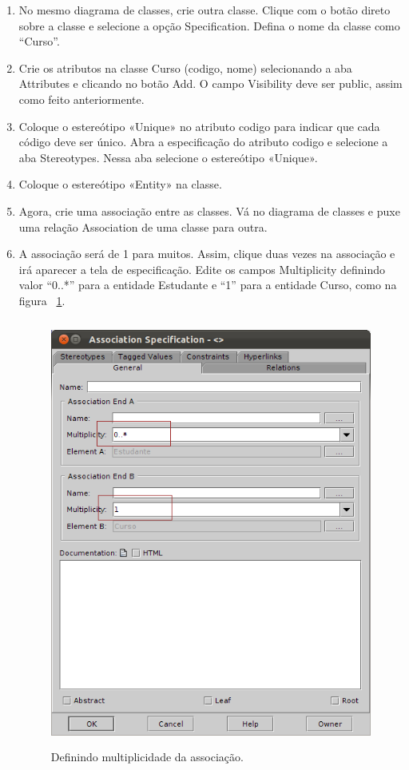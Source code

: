 \begin{enumerate}
\item No mesmo diagrama de classes, crie outra classe. Clique com o botão direto
sobre a classe e selecione a opção Specification. Defina o nome da classe como
“Curso”.
	
\item Crie os atributos na classe Curso (codigo, nome) selecionando a aba
Attributes e clicando no botão Add. O campo Visibility deve ser public, assim
como feito anteriormente.

\item Coloque o estereótipo «Unique» no atributo codigo para indicar que cada
código deve ser único. Abra a especificação do atributo codigo e selecione a aba
Stereotypes. Nessa aba selecione o estereótipo «Unique».
	
\item Coloque o estereótipo «Entity» na classe.
	
\item Agora, crie uma associação entre as classes. Vá no diagrama de classes e
puxe uma relação Association de uma classe para outra.
	
\item A associação será de 1 para muitos. Assim, clique duas vezes na associação
e irá aparecer a tela de especificação. Edite os campos Multiplicity definindo
valor “0..*” para a entidade Estudante e “1” para a entidade Curso, como na
figura ~\ref{define_multiplicidade_associacao}.
\begin{figure}[!htb]
	\centering
	\includegraphics[width=350pt,height=400pt]{imgs/tutorial-mdarte-0005.png}
	\caption{Definindo multiplicidade da associação.}
	\label{define_multiplicidade_associacao}
\end{figure}
	

\end{enumerate}
